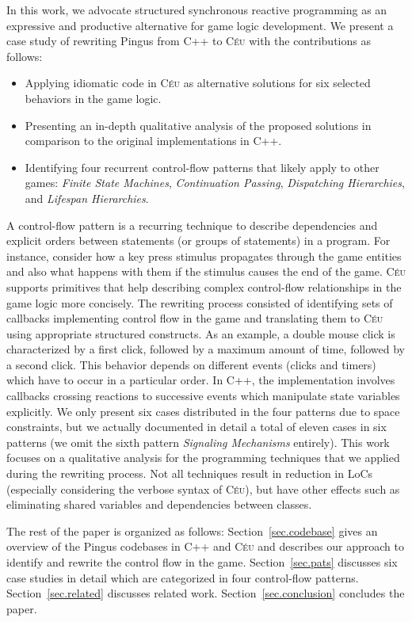 \documentclass{vgtc}                          %
\newcommand{\CEU}{\textsc{C\'{e}u}\xspace}
\begin{document}
In this work, we advocate structured synchronous reactive programming as an
expressive and productive alternative for game logic development.
We present a case study of rewriting Pingus from C++ to \CEU with the
contributions as follows:
%
\begin{itemize}
\item Applying idiomatic code in \CEU as alternative solutions for six selected
      behaviors in the game logic.
\item Presenting an in-depth qualitative analysis of the proposed solutions in
      comparison to the original implementations in C++.
\item Identifying four recurrent control-flow patterns that likely apply to
      other games:
        \emph{Finite State Machines},
        \emph{Continuation Passing},
        \emph{Dispatching Hierarchies}, and
        \emph{Lifespan Hierarchies}.
\end{itemize}
%
A control-flow pattern is a recurring technique to describe dependencies and
explicit orders between statements (or groups of statements) in a program.
For instance, consider how a key press stimulus propagates through the game
entities and also what happens with them if the stimulus causes the end of the
game.
%
\CEU supports primitives that help describing complex control-flow
relationships in the game logic more concisely.
%
The rewriting process consisted of identifying sets of callbacks implementing
control flow in the game and translating them to \CEU using appropriate
structured constructs.
%
As an example, a double mouse click is characterized by a first click, followed
by a maximum amount of time, followed by a second click.
This behavior depends on different events (clicks and timers) which have to
occur in a particular order.
In C++, the implementation involves callbacks crossing reactions to successive
events which manipulate state variables explicitly.
%
We only present six cases distributed in the four patterns due to space
constraints, but we actually documented in detail a total of eleven cases in six
patterns (we omit the sixth pattern \emph{Signaling Mechanisms} entirely).
%
This work focuses on a qualitative analysis for the programming techniques
that we applied during the rewriting process.
Not all techniques result in reduction in LoCs (especially considering the
verbose syntax of \CEU), but have other effects such as eliminating shared
variables and dependencies between classes.

The rest of the paper is organized as follows:
Section~\ref{sec.codebase} gives an overview of the Pingus codebases in C++ and
\CEU and describes our approach to identify and rewrite the control flow in the
game.
Section~\ref{sec.pats} discusses six case studies in detail which are
categorized in four control-flow patterns.
Section~\ref{sec.related} discusses related work.
Section~\ref{sec.conclusion} concludes the paper.
\end{document}
